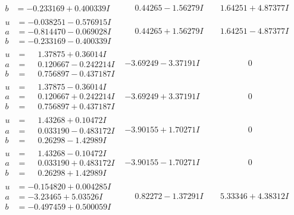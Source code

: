 \documentclass[1p]{elsarticle_modified}
\theoremstyle{definition}
\begin{document}
$$\begin{array}{c|c|c}
\begin{aligned}
b &= -0.233169 + 0.400339 I\end{aligned}
 & \phantom{-}0.44265 - 1.56279 I & \phantom{-}1.64251 + 4.87377 I \\ \hline\begin{aligned}
u &= -0.038251 - 0.576915 I \\
a &= -0.814470 - 0.069028 I \\
b &= -0.233169 - 0.400339 I\end{aligned}
 & \phantom{-}0.44265 + 1.56279 I & \phantom{-}1.64251 - 4.87377 I \\ \hline\begin{aligned}
u &= \phantom{-}1.37875 + 0.36014 I \\
a &= \phantom{-}0.120667 - 0.242214 I \\
b &= \phantom{-}0.756897 - 0.437187 I\end{aligned}
 & -3.69249 - 3.37191 I & \phantom{-0.000000 } 0 \\ \hline\begin{aligned}
u &= \phantom{-}1.37875 - 0.36014 I \\
a &= \phantom{-}0.120667 + 0.242214 I \\
b &= \phantom{-}0.756897 + 0.437187 I\end{aligned}
 & -3.69249 + 3.37191 I & \phantom{-0.000000 } 0 \\ \hline\begin{aligned}
u &= \phantom{-}1.43268 + 0.10472 I \\
a &= \phantom{-}0.033190 - 0.483172 I \\
b &= \phantom{-}0.26298 - 1.42989 I\end{aligned}
 & -3.90155 + 1.70271 I & \phantom{-0.000000 } 0 \\ \hline\begin{aligned}
u &= \phantom{-}1.43268 - 0.10472 I \\
a &= \phantom{-}0.033190 + 0.483172 I \\
b &= \phantom{-}0.26298 + 1.42989 I\end{aligned}
 & -3.90155 - 1.70271 I & \phantom{-0.000000 } 0 \\ \hline\begin{aligned}
u &= -0.154820 + 0.004285 I \\
a &= -3.23465 + 5.03526 I \\
b &= -0.497459 + 0.500059 I\end{aligned}
 & \phantom{-}0.82272 - 1.37291 I & \phantom{-}5.33346 + 4.38312 I \\ \hline\begin{aligned}

\end{aligned}
\end{array}$$
\end{document}

